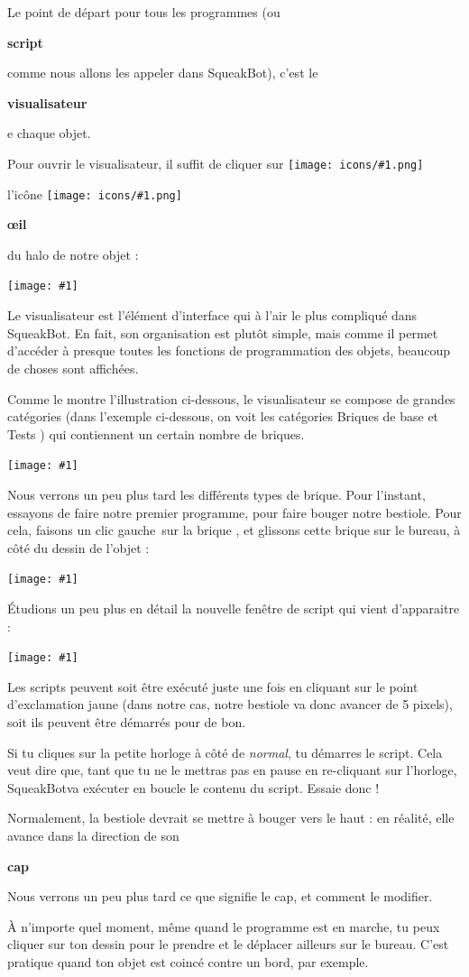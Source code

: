\documentclass[a4paper,12pt]{book}
\def\appName{SqueakBot}
\def\cg{clic gauche~}
\newcommand{\capture}[1]
{
\begin{center}
	\texttt{[image: \#1]}
\end{center}
}
\newcommand{\brique}[1]
{
\fcolorbox[RGB]{200,192,144}{200,248,200}{\textbf{#1}}
}
\newcommand{\important}[1]
{
\textbf{#1}
}
\newcommand{\motcle}[2]
{
\important{\gls{#1}}
}
\newcommand{\inserticon}[1]
{
\texttt{[image: icons/\#1.png]}
}
\newcommand{\icon}[2][]
{
\ifthenelse {\equal{#1} {}} {\inserticon{#2}} {l'icône \inserticon{#2} \important{#1}}
}
\begin{document}
Le point de départ pour tous les programmes (ou \motcle{script}, comme nous allons les appeler dans \appName), c'est le \motcle{visualisateur} de chaque objet.

Pour ouvrir le visualisateur, il suffit de cliquer sur \icon[\og \oe il \fg]{oeil} du halo de notre objet :

\capture{8bis.png}

Le visualisateur est l'élément d'interface qui à l'air le plus compliqué dans \appName. En fait, son organisation est plutôt simple, mais comme il permet d'accéder à presque toutes les fonctions de programmation des objets, beaucoup de choses sont affichées.

Comme le montre l'illustration ci-dessous, le visualisateur se compose de grandes catégories (dans l'exemple ci-dessous, on voit les catégories \og Briques de base \fg et \og Tests \fg) qui contiennent un certain nombre de briques.

\capture{9.png}

Nous verrons un peu plus tard les différents types de brique. Pour l'instant, essayons de faire notre premier programme, pour faire bouger notre bestiole. Pour cela, faisons un \cg sur la brique \brique{avance de 5}, et glissons cette brique sur le bureau, à côté du dessin de l'objet :

\capture{10bis.png}

Étudions un peu plus en détail la nouvelle fenêtre de script qui vient d'apparaitre :

\capture{11bis.png}

Les scripts peuvent soit être exécuté juste une fois en cliquant sur le point d'exclamation jaune (dans notre cas, notre bestiole va donc avancer de 5 pixels), soit ils peuvent être démarrés pour de bon.

Si tu cliques sur la petite horloge à côté de \textit{normal}, tu démarres le script. Cela veut dire que, tant que tu ne le mettras pas en pause en re-cliquant sur l'horloge, \appName va exécuter en boucle le contenu du script. Essaie donc !

Normalement, la bestiole devrait se mettre à bouger vers le haut : en réalité, elle avance dans la direction de son \motcle{cap}. Nous verrons un peu plus tard ce que signifie le cap, et comment le modifier.

À n'importe quel moment, même quand le programme est en marche, tu peux cliquer sur ton dessin pour le prendre et le déplacer ailleurs sur le bureau. C'est pratique quand ton objet est coincé contre un bord, par exemple.
\end{document}
